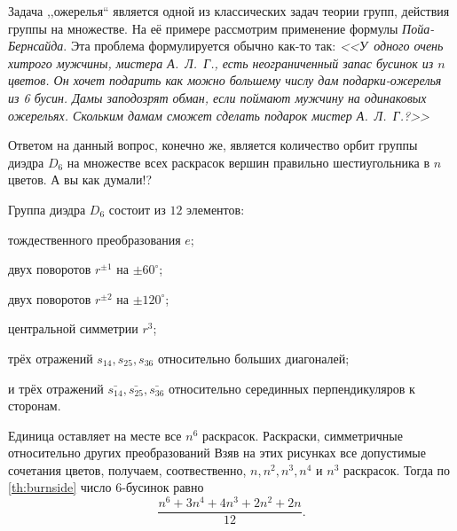 \begin{example}[Ожерелья]
    Задача ,,ожерелья`` является одной из классических задач теории групп, действия группы на множестве. На её примере рассмотрим применение формулы \emph{Пойа-Бернсайда}. Эта проблема формулируется обычно как-то так: \emph{<<У~одного очень хитрого мужчины, мистера А.~Л.~Г., есть неограниченный запас бусинок из $n$ цветов. Он хочет подарить как можно большему числу дам подарки-ожерелья из 6 бусин. Дамы заподозрят обман, если поймают мужчину на одинаковых ожерельях. Скольким дамам сможет сделать подарок мистер А.~Л.~Г.?>>}

    Ответом на данный вопрос, конечно же, является количество орбит группы диэдра $D_6$ на множестве всех раскрасок вершин правильно шестиугольника в $n$ цветов. А вы как думали!?

    Группа диэдра $D_6$ состоит из $12$ элементов: \begin{bullets}
        \item тождественного преобразования $e$; 
        \item двух поворотов $r^{\pm 1}$ на $\pm 60^\circ$;
        \item двух поворотов $r^{\pm 2}$ на $\pm 120^\circ$;
        \item центральной симметрии $r^3$;
        \item трёх отражений $s_{14}, s_{25}, s_{36}$ относительно больших диагоналей;
        \item и трёх отражений $\bar{s_{14}}, \bar{s_{25}}, \bar{s_{36}}$ относительно серединных перпендикуляров к сторонам.
    \end{bullets}
    Единица оставляет на месте все $n^6$ раскрасок. Раскраски, симметричные относительно других преобразований 
    Взяв на этих рисунках все допустимые сочетания цветов, получаем, соотвественно, $n, n^2, n^3, n^4$ и $n^3$ раскрасок. Тогда по \cref{th:burnside} число 6-бусинок равно \[\frac{n^6 + 3n^4 +4n^3+2n^2+2n}{12}.\]
\end{example}

